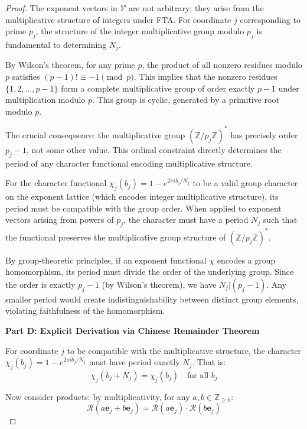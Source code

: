 \begin{proof}
The exponent vectors in $\mathcal{V}$ are not arbitrary; they arise from the multiplicative structure of integers under FTA. For coordinate $j$ corresponding to prime $p_j$, the structure of the integer multiplicative group modulo $p_j$ is fundamental to determining $N_j$.

By Wilson's theorem, for any prime $p$, the product of all nonzero residues modulo $p$ satisfies $(p - 1)! \equiv -1 \pmod{p}$. This implies that the nonzero residues $\{1, 2, \ldots, p - 1\}$ form a complete multiplicative group of order exactly $p - 1$ under multiplication modulo $p$. This group is cyclic, generated by a primitive root modulo $p$.

The crucial consequence: the multiplicative group $(\mathbb{Z}/p_j\mathbb{Z})^*$ has precisely order $p_j - 1$, not some other value. This ordinal constraint directly determines the period of any character functional encoding multiplicative structure.

For the character functional $\chi_j(b_j) = 1 - e^{2\pi i b_j/N_j}$ to be a valid group character on the exponent lattice (which encodes integer multiplicative structure), its period must be compatible with the group order. When applied to exponent vectors arising from powers of $p_j$, the character must have a period $N_j$ such that the functional preserves the multiplicative group structure of $(\mathbb{Z}/p_j\mathbb{Z})^*$.

By group-theoretic principles, if an exponent functional $\chi$ encodes a group homomorphism, its period must divide the order of the underlying group. Since the order is exactly $p_j - 1$ (by Wilson's theorem), we have $N_j | (p_j - 1)$. Any smaller period would create indistinguishability between distinct group elements, violating faithfulness of the homomorphism.

\noindent \textbf{Part D: Explicit Derivation via Chinese Remainder Theorem}

For coordinate $j$ to be compatible with the multiplicative structure, the character $\chi_j(b_j) = 1 - e^{2\pi i b_j / N_j}$ must have period exactly $N_j$. That is:
\begin{equation}
\chi_j(b_j + N_j) = \chi_j(b_j) \quad \text{for all } b_j
\end{equation}

Now consider products: by multiplicativity, for any $a, b \in \mathbb{Z}_{\geq 0}$:
\begin{equation}
\mathcal{R}(a \mathbf{e}_j + b \mathbf{e}_j) = \mathcal{R}(a \mathbf{e}_j) \cdot \mathcal{R}(b \mathbf{e}_j)
\end{equation}


\end{proof}
